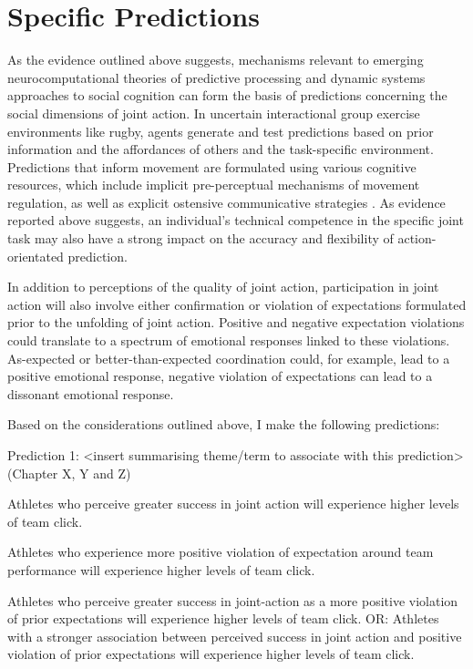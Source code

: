\clearpage

\section{Specific Predictions}
  As the evidence outlined above suggests, mechanisms relevant to emerging neurocomputational theories of predictive processing and dynamic systems approaches to social cognition can form the basis of predictions concerning the social dimensions of joint action.  In uncertain interactional group exercise environments like rugby, agents generate and test predictions based on prior information and the affordances of others and the task-specific environment.  Predictions that inform movement are formulated using various cognitive resources, which include implicit pre-perceptual mechanisms of movement regulation, as well as explicit ostensive communicative strategies \citep{Semin2008,Frith2010}.  As evidence reported above suggests, an individual's technical competence in the specific joint task may also have a strong impact on the accuracy and flexibility of action-orientated prediction.

 In addition to perceptions of the quality of joint action, participation in joint action will also involve either confirmation or violation of expectations formulated prior to the unfolding of joint action. Positive and negative expectation violations could translate to a spectrum of emotional responses linked to these violations.  As-expected or better-than-expected coordination could, for example, lead to a positive emotional response, negative violation of expectations can lead to a dissonant emotional response.

  Based on the considerations outlined above, I make the following predictions:

  \begin{indent}
    \begin{description}
Prediction 1: <insert summarising theme/term to associate with this prediction> (Chapter X, Y and Z)
      \item [Prediction 1.a] Athletes who perceive greater success in joint action will experience higher levels of team click.
      \item [Prediction 1.b] Athletes who experience more positive violation of expectation around team performance will experience higher levels of team click.
      \item [Prediction 1.c] Athletes who perceive greater success in joint-action as a more positive violation of prior expectations will experience higher levels of team click. OR: Athletes with a stronger association between perceived success in joint action and positive violation of prior expectations will experience higher levels of team click.  \\
    \end{description}
  \end{indent}

